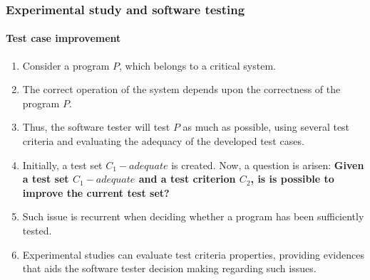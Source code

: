 \begin{frame}[hasprev=false,hasnext=false]
\label{example:experimental-study-motivation}
\frametitle{Experimental study and software testing}
\framesubtitle{Test case improvement}

\begin{enumerate}
	\item Consider a program $P$, which belongs to a critical system.

	\item The correct operation of the system depends upon the correctness of
	the program $P$.

	\item Thus, the software tester will test $P$ as much as possible, using
	several test criteria and evaluating the adequacy of the developed test
	cases.

	\item Initially, a test set $C_{1}-adequate$ is created. Now, a question
	is arisen: \textbf{Given a test set $C_{1}-adequate$ and a test criterion
	$C_{2}$, is is possible to improve the current test set?}

	\item Such issue is recurrent when deciding whether a program has been
	sufficiently tested.

	\item Experimental studies can evaluate test criteria properties, providing
	evidences that aids the software tester decision making regarding such
	issues.
\end{enumerate}
\end{frame}
